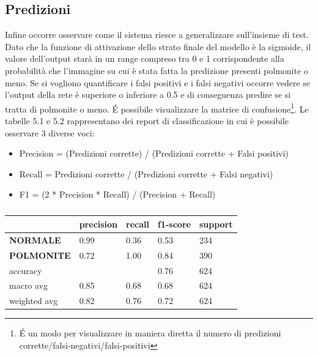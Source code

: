 \subsection{Predizioni}
Infine occorre osservare come il sistema riesce a generalizzare sull’insieme di test. 
Dato che la funzione di attivazione dello strato finale del modello è la sigmoide, 
il valore dell’output starà in un range compreso tra 0 e 1 corrispondente alla probabilità che l’immagine
 su cui è stata fatta la predizione presenti polmonite o meno. 
Se si vogliono quantificare i falsi positivi e i falsi negativi occorre vedere se l’output della 
rete è superiore o inferiore a 0.5  e di conseguenza predire se si tratta di polmonite o meno.
 É possibile visualizzare la matrice di confusione\footnote{É un modo per visualizzare in maniera 
 diretta il numero di predizioni corrette/falsi-negativi/falsi-positivi}. 
 Le tabelle 5.1 e 5.2 rappresentano dei report di classificazione in cui è possibile osservare 3 diverse voci:
\begin{itemize}
  \item Precision = (Predizioni corrette) / (Predizioni corrette + Falsi positivi)
  \item Recall = Predizioni corrette / (Predizioni corrette + Falsi negativi)
  \item F1 = (2 * Precision * Recall) / (Precision + Recall)
\end{itemize}
% 



  \begin{table}[hb!]
  \begin{tabular}{@{}l|llll@{}}
    \toprule
                     & \textbf{precision} & \textbf{recall} & \textbf{f1-score} & \textbf{support} \\ \midrule
  \textbf{NORMALE}   & 0.99               & 0.36            & 0.53              & 234              \\
  \textbf{POLMONITE} & 0.72               & 1.00            & 0.84              & 390              \\ \midrule
  accuracy           &                    &                 & 0.76              & 624              \\
  macro avg          & 0.85               & 0.68            & 0.68              & 624              \\
  weighted avg       & 0.82               & 0.76            & 0.72              & 624              \\ \bottomrule
  \end{tabular}
  \caption{}
\end{table} 
  
